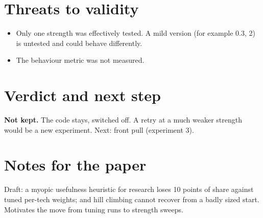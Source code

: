 \documentclass{../polyexp}
\begin{document}

\section{Threats to validity}
\begin{itemize}
\item Only one strength was effectively tested. A mild version (for example  0.3,  2) is untested and could behave differently.
\item The behaviour metric was not measured.
\end{itemize}

\section{Verdict and next step}
\textbf{Not kept.} The code stays, switched off. A retry at a much weaker strength would be a new experiment. Next: front pull (experiment 3).

\section{Notes for the paper}
Draft: a myopic usefulness heuristic for research loses 10 points of share against tuned per-tech weights; and hill climbing cannot recover from a badly sized start. Motivates the move from tuning runs to strength sweeps.

\end{document}
